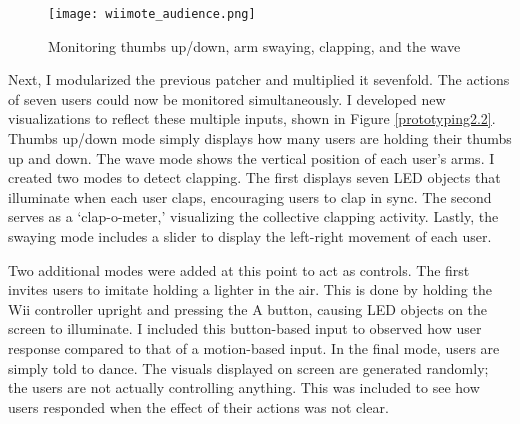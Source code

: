 \begin{figure}[t]
	\centering

	\texttt{[image: wiimote\_audience.png]}
	\caption{Monitoring thumbs up/down, arm swaying, clapping, and the wave}

	\label{prototyping2.1}
\end{figure}

Next, I modularized the previous patcher and multiplied it sevenfold. The actions of seven users could now be monitored simultaneously. I developed new visualizations to reflect these multiple inputs, shown in Figure \ref{prototyping2.2}. Thumbs up/down mode simply displays how many users are holding their thumbs up and down. The wave mode shows the vertical position of each user's arms. I created two modes to detect clapping. The first displays seven LED objects that illuminate when each user claps, encouraging users to clap in sync. The second serves as a `clap-o-meter,' visualizing the collective clapping activity. Lastly, the swaying mode includes a slider to display the left-right movement of each user.

\iffalse
\begin{figure}[t]
	\centering

	\subfloat[Thumbs up/down]{\texttt{[image: thumbs.png]}}
	\hspace{0.1cm}
	\subfloat[The wave]{\texttt{[image: wave.png]}}	
	\hspace{0.1cm}
	\subfloat[Clapping]{\texttt{[image: clap1.png]}}
	\hspace{0.1cm}
	\subfloat[Clap-o-meter]{\texttt{[image: clap2.png]}}
	\hspace{0.1cm}
	\subfloat[Arm swaying]{\texttt{[image: sway.png]}}

	\caption{Input methods}

	\label{prototyping2.2}
\end{figure}
\fi

Two additional modes were added at this point to act as controls. The first invites users to imitate holding a lighter in the air. This is done by holding the Wii controller upright and pressing the A button, causing LED objects on the screen to illuminate. I included this button-based input to observed how user response compared to that of a motion-based input. In the final mode, users are simply told to dance. The visuals displayed on screen are generated randomly; the users are not actually controlling anything. This was included to see how users responded when the effect of their actions was not clear.

